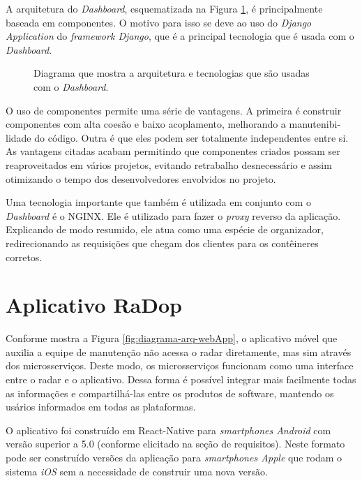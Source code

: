 A arquitetura do \textit{Dashboard}, esquematizada na Figura \ref{fig:diagrama-arq-dashboard}, é principalmente baseada em componentes. O motivo para isso se deve ao uso do \textit{Django Application} do \textit{framework Django}, que é a principal tecnologia que é usada com o \textit{Dashboard}.

\begin{figure}[H]
	\caption{\label{fig:diagrama-arq-dashboard} Diagrama que mostra a arquitetura e tecnologias que são usadas com o \textit{Dashboard}.}
\end{figure}

O uso de componentes permite uma série de vantagens. A primeira é construir componentes com alta coesão e baixo acoplamento, melhorando a manutenibi-lidade do código. Outra é que eles podem ser totalmente independentes entre si. As vantagens citadas acabam permitindo que componentes criados possam ser reaproveitados em vários projetos, evitando retrabalho desnecessário e assim otimizando o tempo dos desenvolvedores envolvidos no projeto.

Uma tecnologia importante que também é utilizada em conjunto com o \textit{Dashboard} é o NGINX. Ele é utilizado para fazer o \textit{proxy} reverso da aplicação. Explicando de modo resumido, ele atua como uma espécie de organizador, redirecionando as requisições que chegam dos clientes para os contêineres corretos.


\section{Aplicativo RaDop}

Conforme mostra a Figura \ref{fig:diagrama-arq-webApp}, o aplicativo móvel que auxilia a equipe de manutenção não acessa o radar diretamente, mas sim através dos microsserviços. Deste modo, os microsserviços funcionam como uma interface entre o radar e o aplicativo. Dessa forma é possível integrar mais facilmente todas as informações e compartilhá-las entre os produtos de software, mantendo os usários informados em todas as plataformas. 

O aplicativo foi construído em React-Native para \textit{smartphones Android} com versão superior a 5.0 (conforme elicitado na seção de requisitos). Neste formato pode ser construído versões da aplicação para \textit{smartphones Apple} que rodam o sistema \textit{iOS} sem a necessidade de construir uma nova versão.

